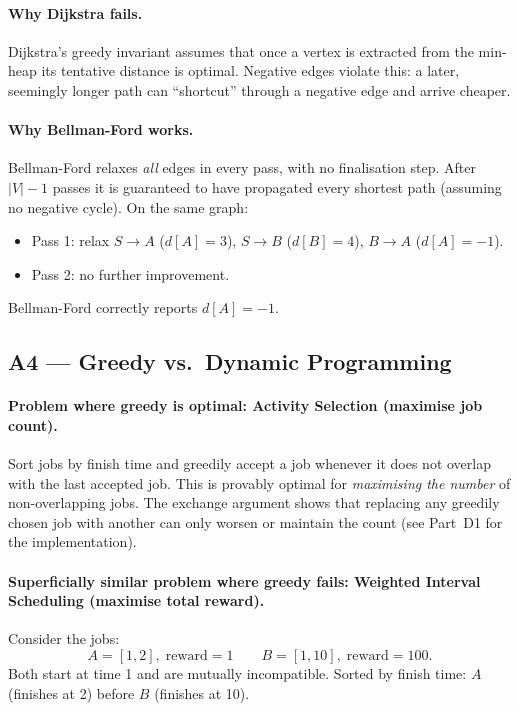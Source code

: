 \documentclass[11pt,a4paper]{article}
\begin{document}
\paragraph{Why Dijkstra fails.}
Dijkstra's greedy invariant assumes that once a vertex is extracted from the min-heap its tentative distance is optimal. Negative edges violate this: a later, seemingly longer path can ``shortcut'' through a negative edge and arrive cheaper.

\paragraph{Why Bellman-Ford works.}
Bellman-Ford relaxes \emph{all} edges in every pass, with no finalisation step. After $|V|-1$ passes it is guaranteed to have propagated every shortest path (assuming no negative cycle). On the same graph:
\begin{itemize}[noitemsep]
  \item Pass 1: relax $S\to A$ ($d[A]=3$), $S\to B$ ($d[B]=4$), $B\to A$ ($d[A]=-1$).
  \item Pass 2: no further improvement.
\end{itemize}
Bellman-Ford correctly reports $d[A]=-1$.

\subsection{A4 --- Greedy vs.\ Dynamic Programming}

\paragraph{Problem where greedy is optimal: Activity Selection (maximise job count).}
Sort jobs by finish time and greedily accept a job whenever it does not overlap with the last accepted job. This is provably optimal for \emph{maximising the number} of non-overlapping jobs. The exchange argument shows that replacing any greedily chosen job with another can only worsen or maintain the count (see Part~D1 for the implementation).

\paragraph{Superficially similar problem where greedy fails: Weighted Interval Scheduling (maximise total reward).}

Consider the jobs:
\[
A = [1,2],\; \text{reward} = 1 \qquad B = [1,10],\; \text{reward} = 100.
\]
Both start at time 1 and are mutually incompatible. Sorted by finish time: $A$ (finishes at 2) before $B$ (finishes at 10).
\end{document}
